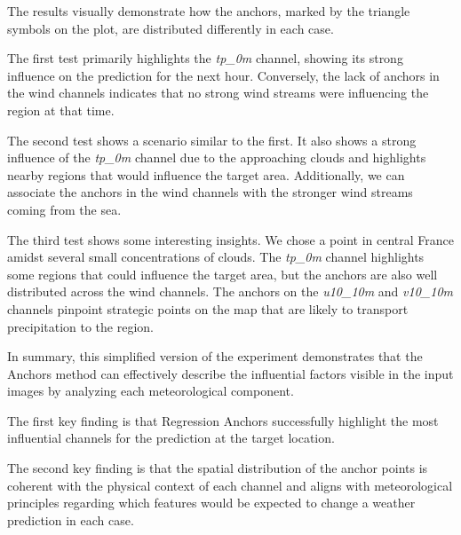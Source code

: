 

The results visually demonstrate how the anchors, marked by the triangle symbols on the plot, are distributed differently in each case.

The first test primarily highlights the \textit{tp\_0m} channel, showing its strong influence on the prediction for the next hour. Conversely, the lack of anchors in the wind channels indicates that no strong wind streams were influencing the region at that time.

The second test shows a scenario similar to the first. It also shows a strong influence of the \textit{tp\_0m} channel due to the approaching clouds and highlights nearby regions that would influence the target area. Additionally, we can associate the anchors in the wind channels with the stronger wind streams coming from the sea.

The third test shows some interesting insights. We chose a point in central France amidst several small concentrations of clouds. The \textit{tp\_0m} channel highlights some regions that could influence the target area, but the anchors are also well distributed across the wind channels. The anchors on the \textit{u10\_10m} and \textit{v10\_10m} channels pinpoint strategic points on the map that are likely to transport precipitation to the region.

In summary, this simplified version of the experiment demonstrates that the Anchors method can effectively describe the influential factors visible in the input images by analyzing each meteorological component.

The first key finding is that Regression Anchors successfully highlight the most influential channels for the prediction at the target location.

The second key finding is that the spatial distribution of the anchor points is coherent with the physical context of each channel and aligns with meteorological principles regarding which features would be expected to change a weather prediction in each case.


